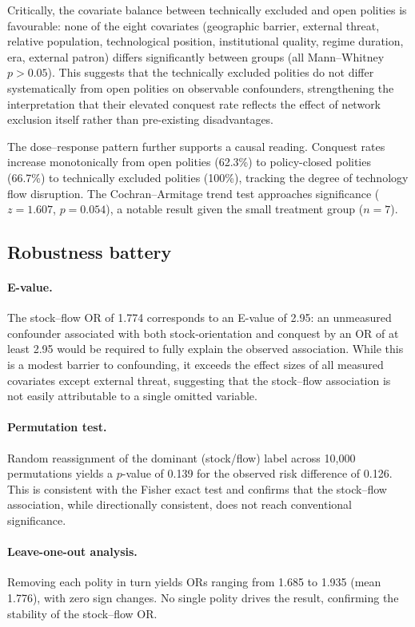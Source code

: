 \documentclass[pdflatex,sn-basic]{sn-jnl}
\theoremstyle{thmstyleone}%
\theoremstyle{thmstyletwo}%
\theoremstyle{thmstylethree}%
\begin{document}
Critically, the covariate balance between technically excluded and open polities is favourable: none of the eight covariates (geographic barrier, external threat, relative population, technological position, institutional quality, regime duration, era, external patron) differs significantly between groups (all Mann--Whitney $p > 0.05$). This suggests that the technically excluded polities do not differ systematically from open polities on observable confounders, strengthening the interpretation that their elevated conquest rate reflects the effect of network exclusion itself rather than pre-existing disadvantages.

The dose--response pattern further supports a causal reading. Conquest rates increase monotonically from open polities (62.3\%) to policy-closed polities (66.7\%) to technically excluded polities (100\%), tracking the degree of technology flow disruption. The Cochran--Armitage trend test approaches significance ($z = 1.607$, $p = 0.054$), a notable result given the small treatment group ($n = 7$).

\subsection{Robustness battery}\label{sec:causal-robustness}

\paragraph{E-value.}
The stock--flow OR of 1.774 corresponds to an E-value of 2.95: an unmeasured confounder associated with both stock-orientation and conquest by an OR of at least 2.95 would be required to fully explain the observed association. While this is a modest barrier to confounding, it exceeds the effect sizes of all measured covariates except external threat, suggesting that the stock--flow association is not easily attributable to a single omitted variable.

\paragraph{Permutation test.}
Random reassignment of the dominant (stock/flow) label across 10{,}000 permutations yields a $p$-value of 0.139 for the observed risk difference of 0.126. This is consistent with the Fisher exact test and confirms that the stock--flow association, while directionally consistent, does not reach conventional significance.

\paragraph{Leave-one-out analysis.}
Removing each polity in turn yields ORs ranging from 1.685 to 1.935 (mean 1.776), with zero sign changes. No single polity drives the result, confirming the stability of the stock--flow OR.
\end{document}
